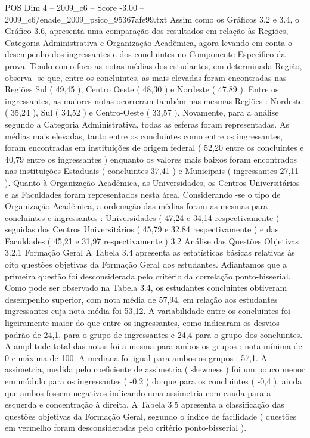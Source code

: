 \begin{textsample}{POS Dim 4 – 2009\_c6 – Score -3.00 – 2009\_c6/enade\_2009\_psico\_95367afe99.txt}
Assim como os Gráficos 3.2 e 3.4, o Gráfico 3.6, apresenta uma comparação dos resultados em relação às Regiões, Categoria Administrativa e Organização Acadêmica, agora levando em conta o desempenho dos ingressantes e dos concluintes no Componente Específico da prova.
Tendo como foco as notas médias dos estudantes, em determinada Região, observa -se que, entre os concluintes, as mais elevadas foram encontradas nas Regiões Sul ( 49,45 ), Centro Oeste ( 48,30 ) e Nordeste ( 47,89 ).
Entre os ingressantes, as maiores notas ocorreram também nas mesmas Regiões : Nordeste ( 35,24 ), Sul ( 34,52 ) e Centro-Oeste ( 33,57 ).
Novamente, para a análise segundo a Categoria Administrativa, todas as esferas foram representadas.
As médias mais elevadas, tanto entre os concluintes como entre os ingressantes, foram encontradas em instituições de origem federal ( 52,20 entre os concluintes e 40,79 entre os ingressantes ) enquanto os valores mais baixos foram encontrados nas instituições Estaduais ( concluintes 37,41 ) e Municipais ( ingressantes 27,11 ).
Quanto à Organização Acadêmica, as Universidades, os Centros Universitários e as Faculdades foram representados nesta área.
Considerando -se o tipo de Organização Acadêmica, a ordenação das médias foram as mesmas para concluintes e ingressantes : Universidades ( 47,24 e 34,14 respectivamente ) seguidas dos Centros Universitários ( 45,79 e 32,84 respectivamente ) e das Faculdades ( 45,21 e 31,97 respectivamente ) 3.2 Análise das Questões Objetivas 3.2.1 Formação Geral A Tabela 3.4 apresenta as estatísticas básicas relativas às oito questões objetivas da Formação Geral dos estudantes.
Adiantamos que a primeira questão foi desconsiderada pelo critério da correlação ponto-bisserial.
Como pode ser observado na Tabela 3.4, os estudantes concluintes obtiveram desempenho superior, com nota média de 57,94, em relação aos estudantes ingressantes cuja nota média foi 53,12.
A variabilidade entre os concluintes foi ligeiramente maior do que entre os ingressantes, como indicaram os desvios-padrão de 24,1, para o grupo de ingressantes e 24,4 para o grupo dos concluintes.
A amplitude total das notas foi a mesma para ambos os grupos : nota mínima de 0 e máxima de 100.
A mediana foi igual para ambos os grupos : 57,1.
A assimetria, medida pelo coeficiente de assimetria ( skewness ) foi um pouco menor em módulo para os ingressantes ( -0,2 ) do que para os concluintes ( -0,4 ), ainda que ambos fossem negativos indicando uma assimetria com cauda para a esquerda e concentração à direita.
A Tabela 3.5 apresenta a classificação das questões objetivas da Formação Geral, segundo o índice de facilidade ( questões em vermelho foram desconsideradas pelo critério ponto-bisserial ).

\end{textsample}
